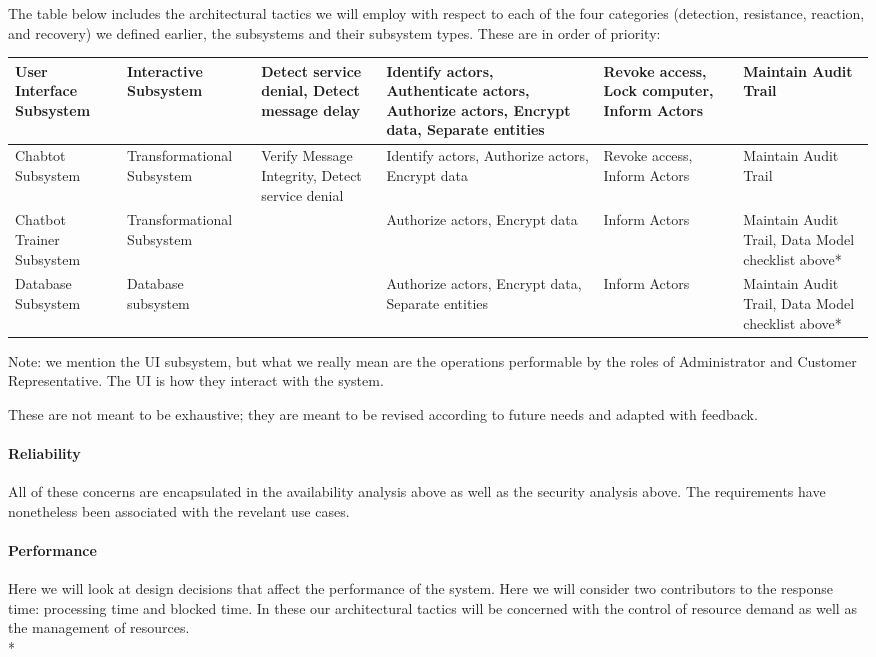 \documentclass[11pt]{article}
\begin{document}
The table below includes the architectural tactics we will employ with respect to each of the four categories (detection, resistance, reaction, and recovery) we defined earlier, the subsystems and their subsystem types. These are in order of priority:
\begin{center}
	\hspace*{-1.5cm}\begin{tabular}{|p{3cm}|p{3cm}|p{3cm}|p{3cm}|p{3cm}|p{3cm}|}
		\hline
		User Interface Subsystem & Interactive Subsystem & Detect service denial, Detect message delay & Identify actors, Authenticate actors, Authorize actors, Encrypt data, Separate entities & Revoke access, Lock computer, Inform Actors & Maintain Audit Trail \\
		\hline
		Chabtot Subsystem & Transformational Subsystem & Verify Message Integrity, Detect service denial & Identify actors, Authorize actors, Encrypt data & Revoke access, Inform Actors & Maintain Audit Trail \\
		\hline
		Chatbot Trainer Subsystem & Transformational Subsystem & & Authorize actors, Encrypt data & Inform Actors & Maintain Audit Trail, Data Model checklist above* \\
		\hline
		Database Subsystem & Database subsystem & & Authorize actors, Encrypt data, Separate entities & Inform Actors & Maintain Audit Trail, Data Model checklist above* \\
		\hline
	\end{tabular}
\end{center}
Note: we mention the UI subsystem, but what we really mean are the operations performable by the roles of Administrator and Customer Representative. The UI is how they interact with the system.

These are not meant to be exhaustive; they are meant to be revised according to future needs and adapted with feedback.

\paragraph{Reliability}
All of these concerns are encapsulated in the availability analysis above as well as the security analysis above. The requirements have nonetheless been associated with the revelant use cases.

\paragraph{Performance}
Here we will look at design decisions that affect the performance of the system. Here we will consider two contributors to the response time: processing time and blocked time\cite{Book:2}. In these our architectural tactics will be concerned with the control of resource demand as well as the management of resources. \\*
\end{document}
